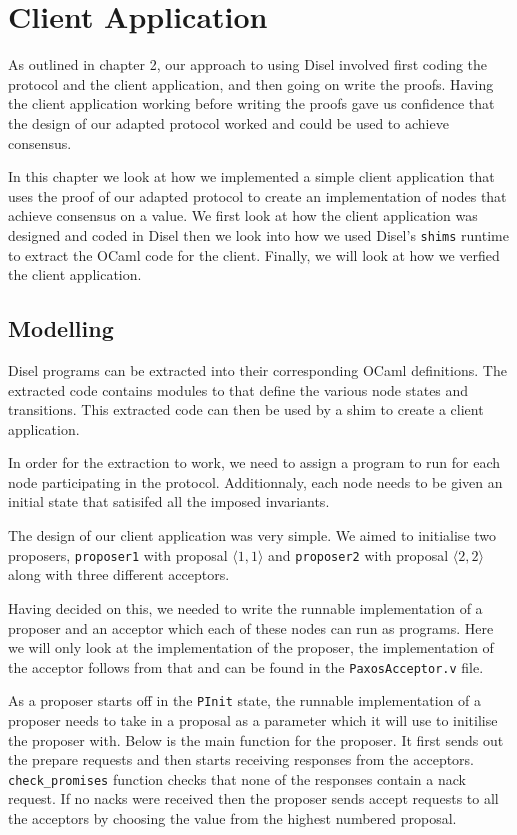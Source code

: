 \chapter{Client Application}
As outlined in chapter 2, our approach to using Disel involved first coding
the protocol and the client application, and then going on write the proofs.
Having the client application working before writing the proofs gave us
confidence that the design of our adapted protocol worked and could be used
to achieve consensus.

In this chapter we look at how we implemented a simple client application
that uses the proof of our adapted protocol to create an implementation of nodes
that achieve consensus on a value. We first look at how the client application was
designed and coded in Disel then we look into how we used Disel's \texttt{shims}
runtime to extract the OCaml code for the client. Finally, we will look at how
we verfied the client application.

\section{Modelling}
Disel programs can be extracted into their corresponding OCaml definitions.
The extracted code contains modules to that define the various node states
and transitions. This extracted code can then be used by a shim to create a
client application.

In order for the extraction to work, we need to assign a program to run for
each node participating in the protocol. Additionnaly, each node needs to
be given an initial state that satisifed all the imposed invariants.

The design of our client application was very simple. We aimed to initialise
two proposers, \texttt{proposer1} with proposal $\langle 1, 1\rangle$ and
\texttt{proposer2} with proposal $\langle 2, 2\rangle$ along with three different
acceptors.

Having decided on this, we needed to write the runnable implementation of a
proposer and an acceptor which each of these nodes can run as programs. Here we
will only look at the implementation of the proposer, the implementation of
the acceptor follows from that and can be found in the \texttt{PaxosAcceptor.v} file.

As a proposer starts off in the \texttt{PInit} state, the runnable implementation
of a proposer needs to take in a proposal as a parameter which it will use to
initilise the proposer with. Below is the main function for the proposer.
It first sends out the prepare requests and then starts receiving responses
from the acceptors. \texttt{check\_promises} function checks that none of the
responses contain a nack request. If no nacks were received then the proposer
sends accept requests to all the acceptors by choosing the value from the
highest numbered proposal.

